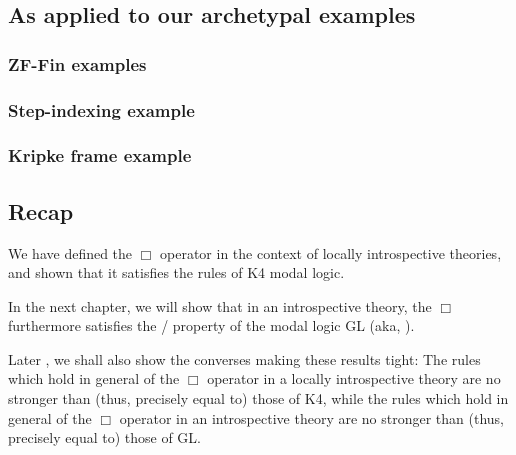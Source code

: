 \subsection{As applied to our archetypal examples}
\TODO

\subsubsection{ZF-Fin examples}

\subsubsection{Step-indexing example}

\subsubsection{Kripke frame example}

\subsection{Recap}
We have defined the $\Box$ operator in the context of locally introspective theories, and shown that it satisfies the rules of K4 modal logic.

In the next chapter, we will show that in an introspective theory, the $\Box$ furthermore satisfies the \Loeb/ property of the modal logic GL (aka, ).

Later , we shall also show the converses making these results tight: The rules which hold in general of the $\Box$ operator in a locally introspective theory are no stronger than (thus, precisely equal to) those of K4, while the rules which hold in general of the $\Box$ operator in an introspective theory are no stronger than (thus, precisely equal to) those of GL.

\fileend